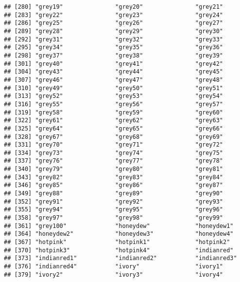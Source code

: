 \documentclass[
]{article}
\begin{document}
\begin{verbatim}
## [280] "grey19"               "grey20"               "grey21"              
## [283] "grey22"               "grey23"               "grey24"              
## [286] "grey25"               "grey26"               "grey27"              
## [289] "grey28"               "grey29"               "grey30"              
## [292] "grey31"               "grey32"               "grey33"              
## [295] "grey34"               "grey35"               "grey36"              
## [298] "grey37"               "grey38"               "grey39"              
## [301] "grey40"               "grey41"               "grey42"              
## [304] "grey43"               "grey44"               "grey45"              
## [307] "grey46"               "grey47"               "grey48"              
## [310] "grey49"               "grey50"               "grey51"              
## [313] "grey52"               "grey53"               "grey54"              
## [316] "grey55"               "grey56"               "grey57"              
## [319] "grey58"               "grey59"               "grey60"              
## [322] "grey61"               "grey62"               "grey63"              
## [325] "grey64"               "grey65"               "grey66"              
## [328] "grey67"               "grey68"               "grey69"              
## [331] "grey70"               "grey71"               "grey72"              
## [334] "grey73"               "grey74"               "grey75"              
## [337] "grey76"               "grey77"               "grey78"              
## [340] "grey79"               "grey80"               "grey81"              
## [343] "grey82"               "grey83"               "grey84"              
## [346] "grey85"               "grey86"               "grey87"              
## [349] "grey88"               "grey89"               "grey90"              
## [352] "grey91"               "grey92"               "grey93"              
## [355] "grey94"               "grey95"               "grey96"              
## [358] "grey97"               "grey98"               "grey99"              
## [361] "grey100"              "honeydew"             "honeydew1"           
## [364] "honeydew2"            "honeydew3"            "honeydew4"           
## [367] "hotpink"              "hotpink1"             "hotpink2"            
## [370] "hotpink3"             "hotpink4"             "indianred"           
## [373] "indianred1"           "indianred2"           "indianred3"          
## [376] "indianred4"           "ivory"                "ivory1"              
## [379] "ivory2"               "ivory3"               "ivory4"              

\end{verbatim}
\end{document}
